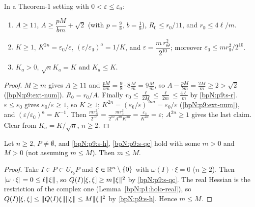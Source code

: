 \begin{lemma}\label{bpN:p9:elementary}
In a Theorem-1 setting with $0<\varepsilon\le\varepsilon_0$:
\begin{enumerate}[label=(\alph*)]
\item $A\ge11$, $A\ge\dfrac{pM}{bm}+\sqrt2$ (with $p=\frac98$, $b=\frac18$), $R_0\le r_0/11$, and $r_0\le4\ell/m$.
\item $K\ge1$, $K^{2n}=\varepsilon_0/\varepsilon$, $(\varepsilon/\varepsilon_0)^a=1/K$, and $\varepsilon=\dfrac{m\,r_\Theta^2}{2^{10}}$; moreover $\varepsilon_0\le m r_0^2/2^{10}$.
\item $K_a>0$, $\sqrt nK_a=K$ and $K_a\le K$.
\end{enumerate}
\end{lemma}
\begin{proof}
\label{stepN:p9:el-a} $M\ge m$ gives $A\ge11$ and $\frac{pM}{bm}=\frac98\cdot8\frac Mm=9\frac Mm$, so $A-\frac{pM}{bm}=\frac{2M}m\ge2>\sqrt2$ (\ref{bpN:p9:ext-num}). $R_0=r_0/A$. Finally $r_0\le\frac\ell{2M}\le\frac\ell{2m}\le\frac{4\ell}m$ by \ref{bpN:p9:s-r}.
\label{stepN:p9:el-b} $\varepsilon\le\varepsilon_0$ gives $\varepsilon_0/\varepsilon\ge1$, so $K\ge1$; $K^{2n}=(\varepsilon_0/\varepsilon)^{2na}=\varepsilon_0/\varepsilon$ (\ref{bpN:p9:ext-num}), and $(\varepsilon/\varepsilon_0)^a=K^{-1}$. Then $\frac{mr_\Theta^2}{2^{10}}=\frac{mr_0^2}{2^{10}A^{2n}K^{2n}}=\frac{\varepsilon_0}{K^{2n}}=\varepsilon$; $A^{2n}\ge1$ gives the last claim.
\label{stepN:p9:el-c} Clear from $K_a=K/\sqrt n$, $n\ge2$.
\end{proof}

\begin{lemma}[$m\le M$ is automatic]\label{bpN:p9:m-le-M}
Let $n\ge2$, $P\ne\emptyset$, and \ref{bpN:p9:s-h}, \ref{bpN:p9:s-qc} hold with some $m>0$ and $M>0$ (not assuming $m\le M$). Then $m\le M$.
\end{lemma}
\begin{proof}
\label{stepN:p9:mm-vec} Take $I\in P\subset U_{r_0}P$ and $\xi\in\mathbb{R}^n\setminus\{0\}$ with $\omega(I)\cdot\xi=0$ ($n\ge2$). Then $\lvert \omega\cdot\xi\rvert=0\le\ell\lVert \xi\rVert$, so $Q(I)[\xi,\xi]\ge m\lVert \xi\rVert^2$ by \ref{bpN:p9:s-qc}. The real Hessian is the restriction of the complex one (Lemma~\ref{bpN:p1:holo-real}), so $Q(I)[\xi,\xi]\le\lVert Q(I)\xi\rVert\lVert \xi\rVert\le M\lVert \xi\rVert^2$ by \ref{bpN:p9:s-h}. Hence $m\le M$.
\end{proof}

